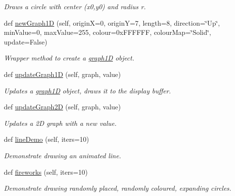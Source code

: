 \begin{DoxyCompactItemize}
\begin{DoxyCompactList}\small\item\em Draws a circle with center (x0,y0) and radius r. \end{DoxyCompactList}\item 
def \hyperlink{classglowbit_1_1glowbitMatrix_afa354570d11280b56d276c45d98021ef}{new\+Graph1D} (self, originX=0, originY=7, length=8, direction=\char`\"{}Up\char`\"{}, min\+Value=0, max\+Value=255, colour=0x\+F\+F\+F\+F\+F\+F, colour\+Map=\char`\"{}\+Solid\char`\"{}, update=\+False)
\begin{DoxyCompactList}\small\item\em Wrapper method to create a \hyperlink{classglowbit_1_1glowbitMatrix_1_1graph1D}{graph1D} object. \end{DoxyCompactList}\item 
def \hyperlink{classglowbit_1_1glowbitMatrix_a0d44976cdc12728d9ae80c2d901029c0}{update\+Graph1D} (self, graph, value)
\begin{DoxyCompactList}\small\item\em Updates a \hyperlink{classglowbit_1_1glowbitMatrix_1_1graph1D}{graph1D} object, draws it to the display buffer. \end{DoxyCompactList}\item 
def \hyperlink{classglowbit_1_1glowbitMatrix_ae9083babec0d5004363782540b60baed}{update\+Graph2D} (self, graph, value)
\begin{DoxyCompactList}\small\item\em Updates a 2D graph with a new value. \end{DoxyCompactList}\item 
\mbox{\label{classglowbit_1_1glowbitMatrix_a0071fd8471e5f519586f6fdd86f8d7f3}} 
def \hyperlink{classglowbit_1_1glowbitMatrix_a0071fd8471e5f519586f6fdd86f8d7f3}{line\+Demo} (self, iters=10)
\begin{DoxyCompactList}\small\item\em Demonstrate drawing an animated line. \end{DoxyCompactList}\item 
def \hyperlink{classglowbit_1_1glowbitMatrix_a69370ec1479b4887fca517fbefd92e4c}{fireworks} (self, iters=10)
\begin{DoxyCompactList}\small\item\em Demonstrate drawing randomly placed, randomly coloured, expanding circles. \end{DoxyCompactList}\item 

\end{DoxyCompactItemize}
